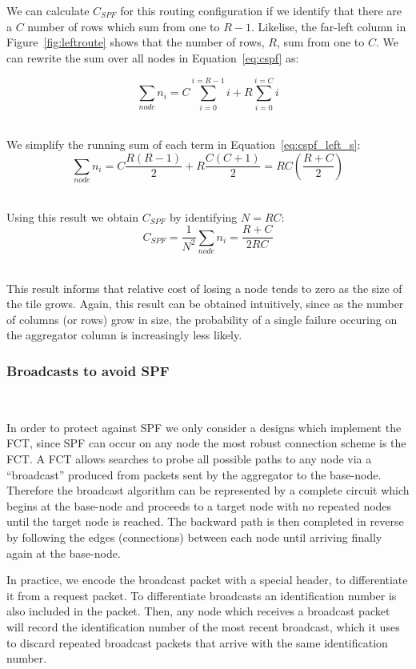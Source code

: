 We can calculate $C_{SPF}$ for this routing configuration if we identify that there are a $C$ number of rows which sum from one to $R-1$.
Likelise, the far-left column in Figure~\ref{fig:leftroute} shows that the number of rows, $R$, sum from one to $C$.
We can rewrite the sum over all nodes in Equation~\ref{eq:cspf} as:

\begin{equation}
  \sum_{node}n_{i} = C\sum_{i=0}^{i=R-1}i + R\sum_{i=0}^{i=C}i
\end{equation}~\label{eq:cspf_left_s}

We simplify the running sum of each term in Equation~\ref{eq:cspf_left_s}:
\begin{equation}
  \sum_{node}n_{i} = C\frac{R(R-1)}{2} + R\frac{C(C+1)}{2} = RC(\frac{R+C}{2})
\end{equation}~\label{eq:cspf_left_e}

Using this result we obtain $C_{SPF}$ by identifying $N = RC$:
\begin{equation}
  C_{SPF} = \frac{1}{N^{2}}\sum_{node}n_{i} = \boxed{\frac{R+C}{2RC}}
\end{equation}~\label{eq:cspf_left_fin}

This result informs that relative cost of losing a node tends to zero as the size of the tile grows.
Again, this result can be obtained intuitively, since as the number of columns (or rows) grow in size, the probability of a single failure occuring on the aggregator column is increasingly less likely.

\subsubsection{Broadcasts to avoid SPF}~\label{sec:broadcast}

In order to protect against SPF we only consider a designs which implement the FCT, since SPF can occur on any node the most robust connection scheme is the FCT.
A FCT allows searches to probe all possible paths to any node via a ``broadcast'' produced from packets sent by the aggregator to the base-node.
Therefore the broadcast algorithm can be represented by a complete circuit which begins at the base-node and proceeds to a target node with no repeated nodes until the target node is reached.
The backward path is then completed in reverse by following the edges (connections) between each node until arriving finally again at the base-node.

In practice, we encode the broadcast packet with a special header, to differentiate it from a request packet. 
To differentiate broadcasts an identification number is also included in the packet.
Then, any node which receives a broadcast packet will record the identification number of the most recent broadcast, which it uses to discard repeated broadcast packets that arrive with the same identification number.

